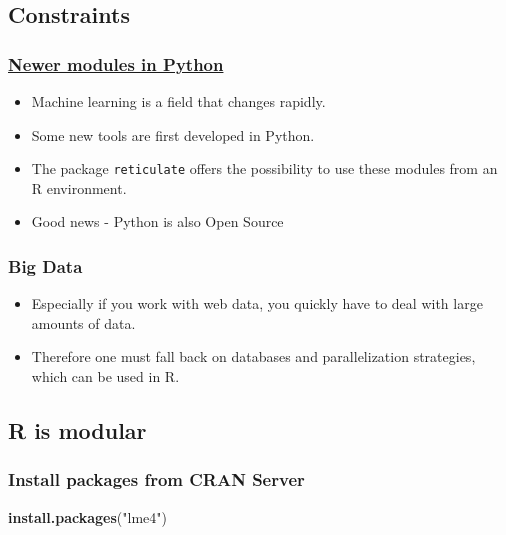 \documentclass[10pt,]{article}
\newenvironment{Shaded}{\begin{snugshade}}{\end{snugshade}}
\newcommand{\KeywordTok}[1]{\textcolor[rgb]{0.13,0.29,0.53}{\textbf{#1}}}
\newcommand{\StringTok}[1]{\textcolor[rgb]{0.31,0.60,0.02}{#1}}
\newcommand{\NormalTok}[1]{#1}
\providecommand{\tightlist}{%
  \setlength{\itemsep}{0pt}\setlength{\parskip}{0pt}}
\begin{document}
\subsection{Constraints}\label{constraints}

\subsubsection{\texorpdfstring{\href{https://blog.dominodatalab.com/video-huge-debate-r-vs-python-data-science/}{Newer
modules in
Python}}{Newer modules in Python}}\label{newer-modules-in-python}

\begin{itemize}
\tightlist
\item
  Machine learning is a field that changes rapidly.\\
\item
  Some new tools are first developed in Python.
\item
  The package \texttt{reticulate} offers the possibility to use these
  modules from an R environment.
\item
  Good news - Python is also Open Source
\end{itemize}

\subsubsection{Big Data}\label{big-data}

\begin{itemize}
\tightlist
\item
  Especially if you work with web data, you quickly have to deal with
  large amounts of data.
\item
  Therefore one must fall back on databases and parallelization
  strategies, which can be used in R.
\end{itemize}

\subsection{R is modular}\label{r-is-modular}

\subsubsection{Install packages from CRAN
Server}\label{install-packages-from-cran-server}

\begin{Shaded}
\begin{Highlighting}[]
\KeywordTok{install.packages}\NormalTok{(}\StringTok{"lme4"}\NormalTok{)}
\end{Highlighting}
\end{Shaded}
\end{document}
